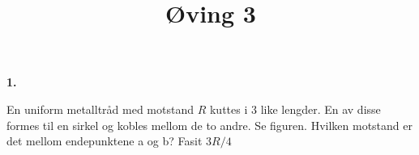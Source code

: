 \documentclass[11pt]{article}
\title{Øving 3}
\begin{document}
    \begin{flushleft}
        \textbf{1.}\par
        En uniform metalltråd med motstand $R$ kuttes i 3 like lengder. En av
        disse formes til en sirkel og kobles mellom de to andre. Se figuren.
        Hvilken motstand er det mellom endepunktene a og b? Fasit $3R/4$
        \bigskip
        




    \end{flushleft}
\end{document}
